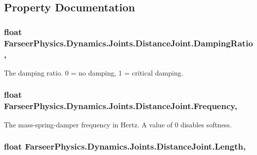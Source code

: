 \subsection{Property Documentation}
\hypertarget{class_farseer_physics_1_1_dynamics_1_1_joints_1_1_distance_joint_a11c8ac989da2bb39a3861fcf24df2d47}{
\subsubsection[{Damping\+Ratio}]{\setlength{\rightskip}{0pt plus 5cm}float Farseer\+Physics.\+Dynamics.\+Joints.\+Distance\+Joint.\+Damping\+Ratio\hspace{0.3cm}{\ttfamily [get]}, {\ttfamily [set]}}}\label{class_farseer_physics_1_1_dynamics_1_1_joints_1_1_distance_joint_a11c8ac989da2bb39a3861fcf24df2d47}


The damping ratio. 0 = no damping, 1 = critical damping. 

\hypertarget{class_farseer_physics_1_1_dynamics_1_1_joints_1_1_distance_joint_a2e450173bb17de6a0c34418c0b90cd6e}{
\subsubsection[{Frequency}]{\setlength{\rightskip}{0pt plus 5cm}float Farseer\+Physics.\+Dynamics.\+Joints.\+Distance\+Joint.\+Frequency\hspace{0.3cm}{\ttfamily [get]}, {\ttfamily [set]}}}\label{class_farseer_physics_1_1_dynamics_1_1_joints_1_1_distance_joint_a2e450173bb17de6a0c34418c0b90cd6e}


The mass-\/spring-\/damper frequency in Hertz. A value of 0 disables softness. 

\hypertarget{class_farseer_physics_1_1_dynamics_1_1_joints_1_1_distance_joint_a7969ab7392686edf98105b7d9291b1e6}{
\subsubsection[{Length}]{\setlength{\rightskip}{0pt plus 5cm}float Farseer\+Physics.\+Dynamics.\+Joints.\+Distance\+Joint.\+Length\hspace{0.3cm}{\ttfamily [get]}, {\ttfamily [set]}}}\label{class_farseer_physics_1_1_dynamics_1_1_joints_1_1_distance_joint_a7969ab7392686edf98105b7d9291b1e6}


